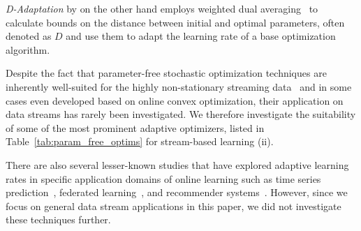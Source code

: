 \documentclass[letterpaper]{article} %
\begin{document}
\textit{D-Adaptation} by \citet{defazioLearningRateFreeLearningDAdaptation2023a} on the other hand employs weighted dual averaging~\cite{duchiDualAveragingDistributed2012} to calculate bounds on the distance between initial and optimal parameters, often denoted as $D$ and use them to adapt the learning rate of a base optimization algorithm.

Despite the fact that parameter-free stochastic optimization techniques are inherently well-suited for the highly non-stationary streaming data~\cite{schaulNoMorePesky2013} and in some cases even developed based on online convex optimization, their application on data streams has rarely been investigated.
We therefore investigate the suitability of some of the most prominent adaptive optimizers, listed in Table~\ref{tab:param_free_optims} for stream-based learning (ii).

There are also several lesser-known studies that have explored adaptive learning rates in specific application domains of online learning such as time series prediction~\cite{miyaguchiCograConceptDriftAwareStochastic2019, fekriDeepLearningLoad2021, zhangPOLAOnlineTime2021a}, federated learning~\cite{canonacoAdaptiveFederatedLearning2021}, and recommender systems~\cite{ferreirajoseADADRIFTAdaptiveLearning2020}.
However, since we focus on general data stream applications in this paper, we did not investigate these techniques further. 
\end{document}
